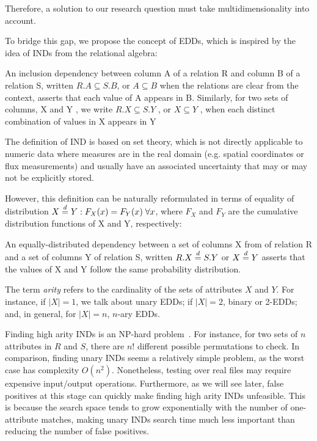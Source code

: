 Therefore, a solution to our research question must take multidimensionality into account.

To bridge this gap, we propose the concept of \glspl{EDD}, which is inspired by the idea of
\glspl{IND} from the relational algebra:

\begin{displayquote}
An inclusion dependency between column A of a relation
R and column B of a relation S, written $R.A \subseteq S.B$, or $A \subseteq B$
when the relations are clear from the context, asserts that each
value of A appears in B. Similarly, for two sets of columns, X
and Y , we write $R.X \subseteq S.Y$ , or $X \subseteq Y$ , when each distinct
combination of values in X appears in Y \cite{abedjan2015}
\end{displayquote}

The definition of \gls{IND} is based on set theory, which is not directly applicable to
numeric data where measures are in the real domain (e.g. spatial coordinates
or flux measurements) and usually
have an associated uncertainty that may or may not be explicitly stored.

However, this definition can be naturally reformulated in terms of
equality of distribution $X \stackrel{d}{=} Y: F_X(x) = F_Y(x) \; \forall x$, where $F_X$ and
$F_Y$ are the cumulative distribution functions of X and Y, respectively:

\begin{definition}
An equally-distributed dependency between a set of columns X from
of relation R and a set of columns Y of relation S, written $R.X \stackrel{d}{=} S.Y$ or
$X \stackrel{d}{=} Y$ asserts that the values of X and Y follow the same probability distribution.
\label{def:eqdist}
\end{definition}

The term \emph{arity} refers to the cardinality of the sets of attributes $X$ and $Y$. For instance, if $|X| = 1$, we talk about unary \glspl{EDD}; if $|X| = 2$,
binary or 2-\glspl{EDD}; and, in general, for $|X| = n$, $n$-ary \glspl{EDD}.

Finding high arity \glspl{IND} is an NP-hard problem~\cite{kantola1992}.
For instance, for two sets of $n$ attributes in $R$ and $S$,
there are $n!$ different possible permutations to check.
In comparison, finding unary \glspl{IND} seems a relatively simple problem,
as the worst case has complexity $O(n^2)$. Nonetheless,
testing over real files may require expensive input/output operations.
Furthermore, as we will see later, false positives at this stage can quickly make
finding high arity \glspl{IND} unfeasible. This is because the search space tends to grow exponentially
with the number of one-attribute matches, making unary \glspl{IND} search time much less important
than reducing the number of false positives.

